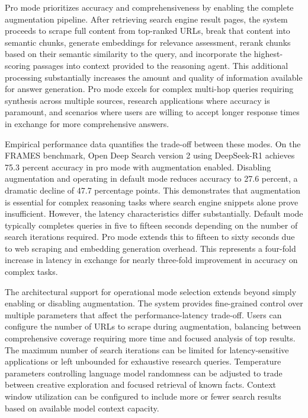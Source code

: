 Pro mode prioritizes accuracy and comprehensiveness by enabling the complete augmentation pipeline. After retrieving search engine result pages, the system proceeds to scrape full content from top-ranked URLs, break that content into semantic chunks, generate embeddings for relevance assessment, rerank chunks based on their semantic similarity to the query, and incorporate the highest-scoring passages into context provided to the reasoning agent. This additional processing substantially increases the amount and quality of information available for answer generation. Pro mode excels for complex multi-hop queries requiring synthesis across multiple sources, research applications where accuracy is paramount, and scenarios where users are willing to accept longer response times in exchange for more comprehensive answers.

Empirical performance data quantifies the trade-off between these modes. On the FRAMES benchmark, Open Deep Search version 2 using DeepSeek-R1 achieves 75.3 percent accuracy in pro mode with augmentation enabled. Disabling augmentation and operating in default mode reduces accuracy to 27.6 percent, a dramatic decline of 47.7 percentage points. This demonstrates that augmentation is essential for complex reasoning tasks where search engine snippets alone prove insufficient. However, the latency characteristics differ substantially. Default mode typically completes queries in five to fifteen seconds depending on the number of search iterations required. Pro mode extends this to fifteen to sixty seconds due to web scraping and embedding generation overhead. This represents a four-fold increase in latency in exchange for nearly three-fold improvement in accuracy on complex tasks.

The architectural support for operational mode selection extends beyond simply enabling or disabling augmentation. The system provides fine-grained control over multiple parameters that affect the performance-latency trade-off. Users can configure the number of URLs to scrape during augmentation, balancing between comprehensive coverage requiring more time and focused analysis of top results. The maximum number of search iterations can be limited for latency-sensitive applications or left unbounded for exhaustive research queries. Temperature parameters controlling language model randomness can be adjusted to trade between creative exploration and focused retrieval of known facts. Context window utilization can be configured to include more or fewer search results based on available model context capacity.

